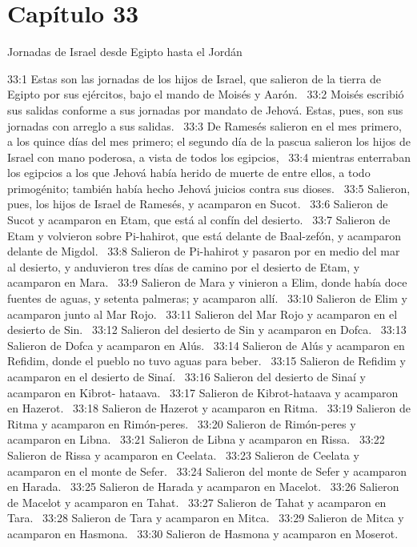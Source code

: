 \section*{Capítulo 33}
Jornadas de Israel desde Egipto hasta el Jordán  

33:1 Estas son las jornadas de los hijos de Israel, que salieron de la tierra de Egipto por sus ejércitos, bajo el mando de Moisés y Aarón.  
33:2 Moisés escribió sus salidas conforme a sus jornadas por mandato de Jehová. Estas, pues, son sus jornadas con arreglo a sus salidas.  
33:3 De Ramesés salieron en el mes primero, a los quince días del mes primero; el segundo día de la pascua salieron los hijos de Israel con mano poderosa, a vista de todos los egipcios,  
33:4 mientras enterraban los egipcios a los que Jehová había herido de muerte de entre ellos, a todo primogénito; también había hecho Jehová juicios contra sus dioses.  
33:5 Salieron, pues, los hijos de Israel de Ramesés, y acamparon en Sucot.  
33:6 Salieron de Sucot y acamparon en Etam, que está al confín del desierto.  
33:7 Salieron de Etam y volvieron sobre Pi-hahirot, que está delante de Baal-zefón, y acamparon delante de Migdol.  
33:8 Salieron de Pi-hahirot y pasaron por en medio del mar al desierto, y anduvieron tres días de camino por el desierto de Etam, y acamparon en Mara.  
33:9 Salieron de Mara y vinieron a Elim, donde había doce fuentes de aguas, y setenta palmeras; y acamparon allí.  
33:10 Salieron de Elim y acamparon junto al Mar Rojo.  
33:11 Salieron del Mar Rojo y acamparon en el desierto de Sin.  
33:12 Salieron del desierto de Sin y acamparon en Dofca.  
33:13 Salieron de Dofca y acamparon en Alús.  
33:14 Salieron de Alús y acamparon en Refidim, donde el pueblo no tuvo aguas para beber.  
33:15 Salieron de Refidim y acamparon en el desierto de Sinaí.  
33:16 Salieron del desierto de Sinaí y acamparon en Kibrot- hataava.  
33:17 Salieron de Kibrot-hataava y acamparon en Hazerot.  
33:18 Salieron de Hazerot y acamparon en Ritma.  
33:19 Salieron de Ritma y acamparon en Rimón-peres.  
33:20 Salieron de Rimón-peres y acamparon en Libna.  
33:21 Salieron de Libna y acamparon en Rissa.  
33:22 Salieron de Rissa y acamparon en Ceelata.  
33:23 Salieron de Ceelata y acamparon en el monte de Sefer.  
33:24 Salieron del monte de Sefer y acamparon en Harada.  
33:25 Salieron de Harada y acamparon en Macelot.  
33:26 Salieron de Macelot y acamparon en Tahat.  
33:27 Salieron de Tahat y acamparon en Tara.  
33:28 Salieron de Tara y acamparon en Mitca.  
33:29 Salieron de Mitca y acamparon en Hasmona.  
33:30 Salieron de Hasmona y acamparon en Moserot.  
